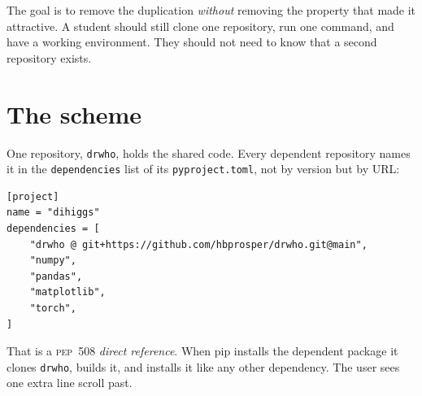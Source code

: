 \documentclass[11pt,a4paper]{article}
\newcommand{\pkg}[1]{\texttt{#1}}
\begin{document}
The goal is to remove the duplication \emph{without} removing the property that
made it attractive. A student should still clone one repository, run one command,
and have a working environment. They should not need to know that a second
repository exists.

\section{The scheme}

One repository, \pkg{drwho}, holds the shared code. Every dependent repository
names it in the \texttt{dependencies} list of its \texttt{pyproject.toml}, not by
version but by URL:

\begin{lstlisting}[style=tomlst]
[project]
name = "dihiggs"
dependencies = [
    "drwho @ git+https://github.com/hbprosper/drwho.git@main",
    "numpy",
    "pandas",
    "matplotlib",
    "torch",
]
\end{lstlisting}

That is a \textsc{pep}~508 \emph{direct reference}. When pip installs the
dependent package it clones \pkg{drwho}, builds it, and installs it like any
other dependency. The user sees one extra line scroll past.

\begin{center}
\end{center}
\end{document}
